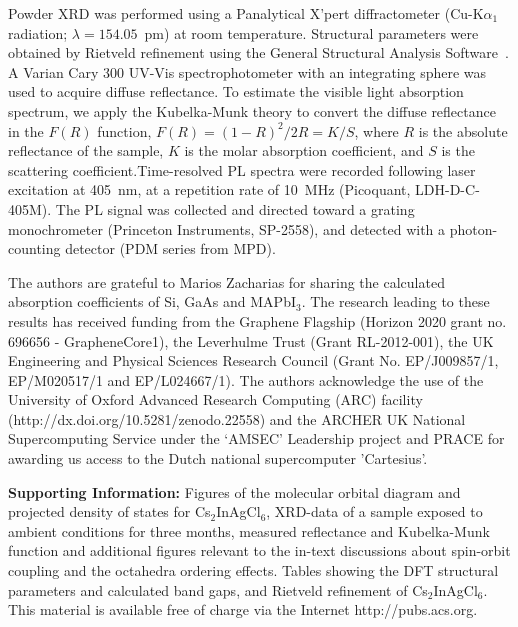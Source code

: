 \documentclass[journal=jpcl,manuscript=letter,layout=traditional]{achemso}
\begin{document}
Powder XRD was performed using a Panalytical X'pert diffractometer (Cu-K$\alpha_1$ radiation;
$\lambda = 154.05$~pm) at room temperature. Structural parameters were obtained by Rietveld refinement
using the General Structural Analysis Software~\cite{Larson2000,Toby2001}.
A Varian Cary 300 UV-Vis spectrophotometer with an integrating sphere was used to acquire diffuse
reflectance. To estimate the visible light absorption spectrum, we apply the Kubelka-Munk theory
to convert the diffuse reflectance in the $F(R)$ function, $F(R) = (1-R)^2/2R = K/S$, where
$R$ is the absolute reflectance of the sample, $K$ is the molar absorption coefficient, and
$S$ is the scattering coefficient.Time-resolved PL spectra were recorded following laser excitation at
405~nm, at a repetition rate of 10~MHz (Picoquant, LDH-D-C-405M). The PL signal was collected and directed
toward a grating monochrometer (Princeton Instruments, SP-2558), and detected with a photon-counting
detector (PDM series from MPD).

\begin{acknowledgement}
The authors are grateful to Marios Zacharias for sharing
the calculated absorption coefficients of Si, GaAs and MAPbI$_3$.
The research leading to these results has received funding from the Graphene Flagship (Horizon 2020
grant no. 696656 - GrapheneCore1), the Leverhulme Trust (Grant RL-2012-001), the UK Engineering and
Physical Sciences Research Council (Grant No. EP/J009857/1, EP/M020517/1 and EP/L024667/1). The authors
acknowledge the use of the University of Oxford Advanced Research Computing (ARC) facility
(http://dx.doi.org/10.5281/zenodo.22558) and the ARCHER UK National Supercomputing Service under
the `AMSEC' Leadership project and PRACE for awarding us access to the Dutch national supercomputer
'Cartesius'.
\end{acknowledgement}

\vspace{0.6cm}

{\bf Supporting Information: } Figures of the molecular orbital diagram and projected density of states for
Cs$_2$InAgCl$_6$, XRD-data of a sample exposed to ambient conditions for three months, measured reflectance
and Kubelka-Munk function and additional figures relevant to the in-text discussions about spin-orbit coupling
and the octahedra ordering effects. Tables showing the DFT structural parameters and calculated band gaps, and
Rietveld refinement of Cs$_2$InAgCl$_6$. This material is available free of charge via the Internet
http://pubs.acs.org.
\end{document}
